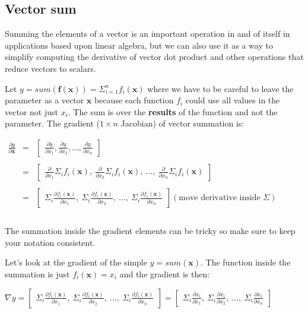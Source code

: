 \documentclass[11pt]{article}
\begin{document}
\subsection{Vector sum}

Summing the elements of a vector is an important operation in and of itself in applications based upon linear algebra, but we can also use it as a way to simplify computing the derivative of vector dot product and other operations that reduce vectors to scalars.

Let $y = sum( \mathbf{f}(\mathbf{x})) = \Sigma_{i=1}^n f_i(\mathbf{x})$ where we have to be careful to leave the parameter as a vector $\mathbf{x}$ because each function $f_i$ could use all values in the vector not just $x_i$. The sum is over the {\bf results} of the function and not the parameter. The gradient ($1 \times n$ Jacobian) of vector summation is:

$
\begin{array}{lcl}
\frac{\partial y}{\partial \mathbf{x}} & = & \begin{bmatrix} \frac{\partial y}{\partial x_1}, \frac{\partial y}{\partial x_2}, \ldots, \frac{\partial y}{\partial x_n} \end{bmatrix}\\\\
 & = & \begin{bmatrix} \frac{\partial}{\partial x_1} \Sigma_i f_i(\mathbf{x}),~ \frac{\partial}{\partial x_2} \Sigma_i f_i(\mathbf{x}),~ \ldots,~ \frac{\partial}{\partial x_n} \Sigma_i  f_i(\mathbf{x}) \end{bmatrix} \\\\
 & = & \begin{bmatrix} \Sigma_i \frac{\partial f_i(\mathbf{x})}{\partial x_1},~ \Sigma_i \frac{\partial f_i(\mathbf{x})}{\partial x_2},~ \ldots,~ \Sigma_i \frac{\partial f_i(\mathbf{x})}{\partial x_n}  \end{bmatrix}(\text{move derivative inside }\Sigma)\\\\
\end{array}
$

The summation inside the gradient elements can be tricky so make sure to keep your notation consistent. 

Let's look at the gradient of the simple $y = sum(\mathbf{x})$. The function inside the summation is just $f_i(\mathbf{x}) = x_i$ and the gradient is then:

$\nabla y = \begin{bmatrix} \Sigma_i \frac{\partial f_i(\mathbf{x})}{\partial x_1},~ \Sigma_i \frac{\partial f_i(\mathbf{x})}{\partial x_2},~ \ldots,~ \Sigma_i \frac{\partial f_i(\mathbf{x})}{\partial x_n}  \end{bmatrix} = \begin{bmatrix} \Sigma_i \frac{\partial x_i}{\partial x_1},~ \Sigma_i \frac{\partial x_i}{\partial x_2},~ \ldots,~ \Sigma_i \frac{\partial x_i}{\partial x_n}  \end{bmatrix}$
\end{document}
